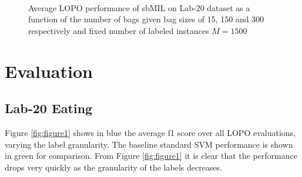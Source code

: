 \documentclass{sigchi}
\begin{document}
\begin{figure}
  \centering
  \qquad
  \qquad
  \caption{Average LOPO performance of sbMIL on Lab-20 dataset as a function of the number of bags given bag sizes of 15, 150 and 300 respectively and fixed number of labeled instances $M = 1500$}~\label{fig:figure3}
\end{figure}

\section{Evaluation}

\subsection{Lab-20 Eating}

Figure \ref{fig:figure1} shows in blue the average f1 score over all LOPO evaluations, varying the label granularity. The baseline standard SVM performance is shown in green for comparison. From Figure \ref{fig:figure1} it is clear that the performance drops very quickly as the granularity of the labels decreases.
\end{document}
